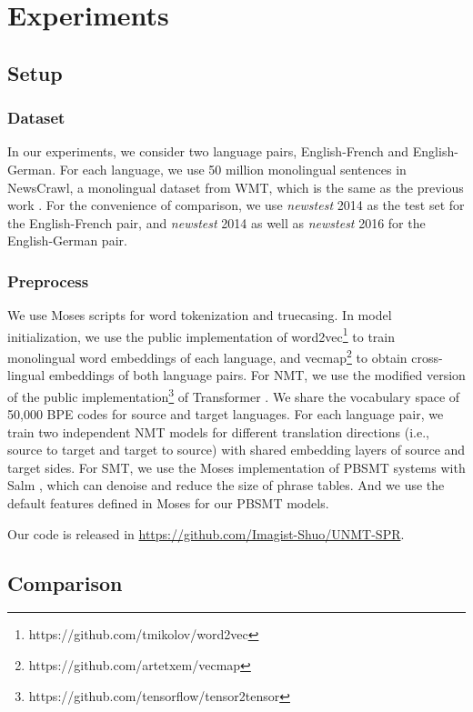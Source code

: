 \documentclass[letterpaper]{article} \usepackage{aaai19}  \usepackage{times}  \usepackage{helvet}  \usepackage{courier}  \usepackage{url}  \usepackage{graphicx}  \usepackage{amsmath}
\begin{document}
\section{Experiments}
\subsection{Setup}
\subsubsection{Dataset}
In our experiments, we consider two language pairs, English-French and English-German. For each language, we use 50 million monolingual sentences in NewsCrawl, a monolingual dataset from WMT, which is the same as the previous work \cite{artetxe2017unsupervised,lample2018phrase}. For the convenience of comparison, we use \emph{newstest} 2014 as the test set for the English-French pair, and \emph{newstest} 2014 as well as \emph{newstest} 2016 for the English-German pair.
\subsubsection{Preprocess}
We use Moses scripts for word tokenization and truecasing. In model initialization, we use the public implementation of word2vec\footnote{https://github.com/tmikolov/word2vec} to train monolingual word embeddings of each language, and vecmap\footnote{https://github.com/artetxem/vecmap} to obtain cross-lingual embeddings of both language pairs. For NMT, we use the modified version of the public implementation\footnote{https://github.com/tensorflow/tensor2tensor} of Transformer \cite{vaswani2017attention}. We share the vocabulary space of 50,000 BPE codes \cite{sennrich2015neural} for source and target languages. For each language pair, we train two independent NMT models for different translation directions (i.e., source to target and target to source) with shared embedding layers of source and target sides. For SMT, we use the Moses implementation of PBSMT systems with Salm \cite{johnson2007improving}, which can denoise and reduce the size of phrase tables. And we use the default features defined in Moses for our PBSMT models. 

Our code is released in \url{https://github.com/Imagist-Shuo/UNMT-SPR}.

\subsection{Comparison}
\label{comparison}
\end{document}
